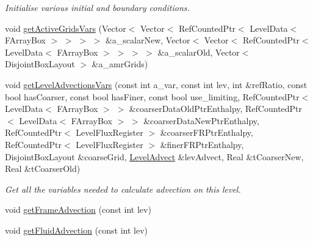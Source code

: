 \begin{DoxyCompactItemize}
\begin{DoxyCompactList}\small\item\em Initialise various initial and boundary conditions. \end{DoxyCompactList}\item 
void \hyperlink{classamr_mushy_layer_a2f60c4520ecd9955f4fa9d26790b82d5}{get\-Active\-Grids\-Vars} (Vector$<$ Vector$<$ Ref\-Counted\-Ptr$<$ Level\-Data$<$ F\-Array\-Box $>$ $>$ $>$ $>$ \&a\-\_\-scalar\-New, Vector$<$ Vector$<$ Ref\-Counted\-Ptr$<$ Level\-Data$<$ F\-Array\-Box $>$ $>$ $>$ $>$ \&a\-\_\-scalar\-Old, Vector$<$ Disjoint\-Box\-Layout $>$ \&a\-\_\-amr\-Grids)
\item 
\hypertarget{classamr_mushy_layer_a402fc66363b84c6a064ef92ee8b37a1e}{void \hyperlink{classamr_mushy_layer_a402fc66363b84c6a064ef92ee8b37a1e}{get\-Level\-Advections\-Vars} (const int a\-\_\-var, const int lev, int \&ref\-Ratio, const bool has\-Coarser, const bool has\-Finer, const bool use\-\_\-limiting, Ref\-Counted\-Ptr$<$ Level\-Data$<$ F\-Array\-Box $>$ $>$ \&coarser\-Data\-Old\-Ptr\-Enthalpy, Ref\-Counted\-Ptr$<$ Level\-Data$<$ F\-Array\-Box $>$ $>$ \&coarser\-Data\-New\-Ptr\-Enthalpy, Ref\-Counted\-Ptr$<$ Level\-Flux\-Register $>$ \&coarser\-F\-R\-Ptr\-Enthalpy, Ref\-Counted\-Ptr$<$ Level\-Flux\-Register $>$ \&finer\-F\-R\-Ptr\-Enthalpy, Disjoint\-Box\-Layout \&coarse\-Grid, \hyperlink{class_level_advect}{Level\-Advect} \&lev\-Advect, Real \&t\-Coarser\-New, Real \&t\-Coarser\-Old)}\label{classamr_mushy_layer_a402fc66363b84c6a064ef92ee8b37a1e}

\begin{DoxyCompactList}\small\item\em Get all the variables needed to calculate advection on this level. \end{DoxyCompactList}\item 
void \hyperlink{classamr_mushy_layer_a6ba0c9d6199a5aed7ad596639c90656d}{get\-Frame\-Advection} (const int lev)
\item 
\hypertarget{classamr_mushy_layer_af3003a8b8122c744d6809731b1940210}{void \hyperlink{classamr_mushy_layer_af3003a8b8122c744d6809731b1940210}{get\-Fluid\-Advection} (const int lev)}\label{classamr_mushy_layer_af3003a8b8122c744d6809731b1940210}


\end{DoxyCompactItemize}
